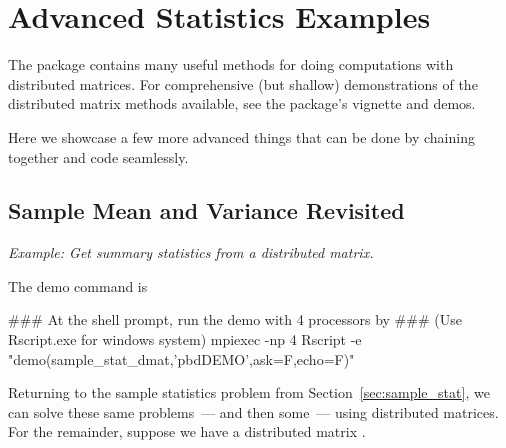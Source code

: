 
\chapter{Advanced Statistics Examples}\label{chpt:avdstat}

The  package contains many useful methods for doing computations
with distributed matrices. For comprehensive (but shallow) demonstrations of
the distributed matrix methods available, see the  package's
vignette and demos.

Here we showcase a few more advanced things that can be done by chaining
together  and  code seamlessly.





\section{Sample Mean and Variance Revisited}

\emph{Example:  Get summary statistics from a distributed matrix.}

The demo command is
\begin{Command}
### At the shell prompt, run the demo with 4 processors by
### (Use Rscript.exe for windows system)
mpiexec -np 4 Rscript -e "demo(sample_stat_dmat,'pbdDEMO',ask=F,echo=F)"
\end{Command}

Returning to the sample statistics problem from
Section~\ref{sec:sample_stat}, we can solve these same problems~--- and
then some~--- using distributed matrices. For the remainder, suppose we
have a distributed matrix .


